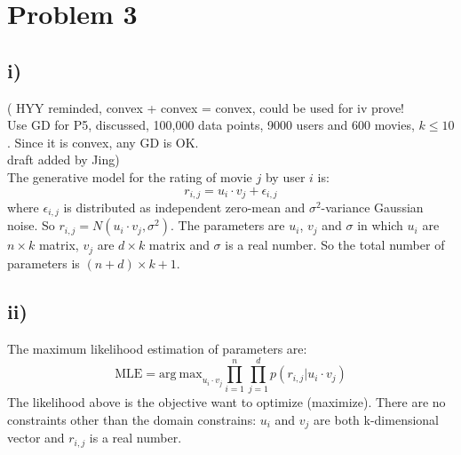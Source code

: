 \documentclass[twoside,11pt]{homework}
\date{\today} %
\begin{document}
\maketitle

\section*{Problem 3}
\subsection*{i)}
\color{red} (
HYY reminded, convex + convex = convex, could be used for iv prove! \\
Use GD for P5, discussed, 100,000 data points, 9000 users and 600 movies, $k \le 10$.
Since it is convex, any GD is OK.\\
draft added by Jing) \color{black} \\
The generative model for the rating of movie $j$ by user $i$ is:
%
\begin{equation}
r_{i, j} = u_i \cdot v_j + \epsilon_{i, j}
\end{equation}
%
where $\epsilon_{i, j}$ is distributed as independent zero-mean and $\sigma^2$-variance Gaussian noise.
So $r_{i, j} = N(u_i \cdot v_j, \sigma^2)$.
The parameters are  $u_i$, $v_j$ and $\sigma$ in which $u_i$ are $n \times k$ matrix, $v_j$ are $d\times k$ matrix and $\sigma$ is a real number.
So the total number of parameters is $(n+d)\times k + 1$.

\subsection*{ii)}
The maximum likelihood estimation of parameters are:
%
\begin{equation}
\mathrm{MLE} %
= \mathrm{arg\ max}_{u_i \cdot v_j} \prod_{i=1}^n \prod_{j=1}^d p(r_{i,j}|u_i \cdot v_j)
\label{mle}
\end{equation}
%
The likelihood above is the objective want to optimize (maximize).
There are no constraints other than the domain constrains: 
$u_i$ and $v_j$ are both k-dimensional vector and $r_{i, j}$ is a real number.
\end{document}
